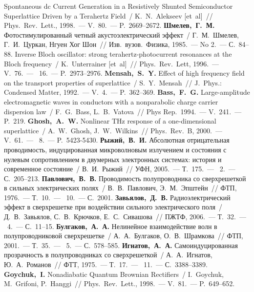 \begin{thebibliography}{99}
	   Spontaneous dc Current Generation in a Resistively Shunted Semiconductor Superlattice Driven by a Terahertz Field~/ K.~N.~Alekseev [et~al]~// Phys.~Rev.~Lett., 1998.~--- V.~80.~--- P.~2669--2672.
       \textbf{Шмелев,~Г.~М.} Фотостимулированный четный акустоэлектрический эффект~/ Г.~М.~Шмелев, Г.~И.~Цуркан, Нгуен Хог Шон~// Изв.~вузов.~Физика, 1985.~--- No 2.~--- С.~84--88.
       Inverse Bloch oscillator: strong terahertz-photocurrent resonances at the Bloch frequency~/ K.~Unterrainer [et~al]~// Phys.~Rev.~Lett, 1996.~--- V.~76.~--- \No~16.~--- P.~2973--2976.
     \textbf{Mensah,~S.~Y.} Effect of high frequency field on the transport properties of superlattice~/ S.~Y.~Mensah~// J.~Phys.: Condensed Matter, 1992.~--- V.~4.~--- P.~362--369.
	 \textbf{Bass,~F.~G.} Large-amplitude electromagnetic waves in conductors with a nonparabolic charge carrier dispersion law~/ F.~G.~Bass, L.~B.~Vatova~// Phys Rep.~1994.~--- V.~241.~--- P.~219.
	 \textbf{Ghosh,~A.~W.} Nonlinear THz response of a one-dimensional superlattice~/ A.~W.~Ghosh, J.~W.~Wilkins~// Phys.~Rev.~B, 2000.~--- V.~61.~--- \No~8.~--- P.~5423-5430.
       \textbf{Рыжий,~В.~И.} Абсолютная отрицательная проводимость, индуцированная микроволновым излучением и состояния с нулевым сопротивлением в двумерных электронных системах: история и современное состояние~/ В.~И.~Рыжий~// УФН, 2005.~--- Т.~175.~--- \No~2.~--- С.~205--213.
     \textbf{Павлович,~В.~В.} Проводимость полупроводника со сверхрешеткой в сильных электрических полях~/ В.~В.~Павлович, Э.~М.~Эпштейн~// ФТП, 1976.~--- Т.~10.~--- \No~10.~--- С.~2001.
     \textbf{Завьялов,~Д.~В.} Радиоэлектрический эффект в сверхрешетке при воздействии сильного электрического поля~/ Д.~В.~Завьялов, С.~В.~Крючков, Е.~С.~Сивашова~// ПЖТФ, 2006.~--- Т.~32.~--- \No~4.~--- С.~11--15.
     \textbf{Булгаков,~А.~А.} Нелинейное взаимодействие волн в полупроводниковой сверхрешетке~/ А.~А.~Булгаков, О.~В.~Шрамкова~// ФТП, 2001.~--- Т.~35.~--- \No~5.~--- С.~578--585.
     \textbf{Игнатов,~А.~А.} Самоиндуцированная прозрачность в полупроводниках со сверхрешеткой~/ А.~А.~Игнатов, Ю.~А.~Романов~// ФТТ, 1975.~--- Т.~17.~--- \No~11.~--- С.~3388--3389.
       \textbf{Goychuk,~I.} Nonadiabatic Quantum Brownian Rectifiers~/ I.~Goychuk, M.~Grifoni, P.~Hanggi~// Phys.~Rev.~Lett., 1998.~--- V.~81.~--- P.~649--652.

\end{thebibliography}
